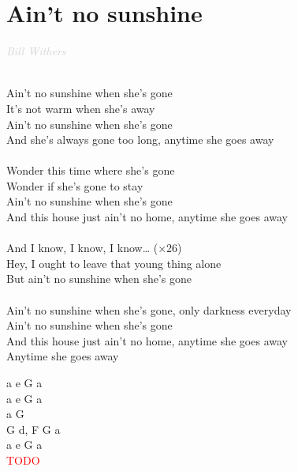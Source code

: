 \documentclass[a5paper, 10pt]{book}
\begin{document}
\section{Ain't no sunshine}\textcolor{lightgray}{\textit{Bill Withers}}\\~\\
\begin{minipage}[t]{0.8\textwidth}
Ain't no sunshine when she's gone\\
It's not warm when she's away\\
Ain't no sunshine when she's gone\\
And she's always gone too long, anytime she goes away\\
\\
Wonder this time where she's gone\\
Wonder if she's gone to stay\\
Ain't no sunshine when she's gone\\
And this house just ain't no home, anytime she goes away\\
\\
\hspace*{5mm}And I know, I know, I know… ($\times$26)\\
\hspace*{5mm}Hey, I ought to leave that young thing alone\\
\hspace*{5mm}But ain't no sunshine when she's gone\\
\\
Ain't no sunshine when she's gone, only darkness everyday\\
Ain't no sunshine when she's gone\\
And this house just ain't no home, anytime she goes away\\
Anytime she goes away
\end{minipage}
\begin{minipage}[t]{0.2\textwidth}
a e G  a\\
a e G  a\\
a G  \\
G d, F G a\\
a e G  a\\

\textcolor{red}{TODO}\\
\end{minipage}

\newpage
\end{document}
